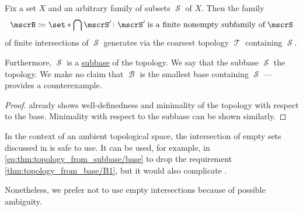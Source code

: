 \begin{proposition}\label{thm:topology_from_subbase}
  Fix a set \( X \) and an arbitrary family of subsets \( \mscrS \) of \( X \). Then the family
  \begin{equation}\label{eq:thm:topology_from_subbase/base}
    \mscrB \coloneqq \set*{ \bigcap \mscrS' \colon \mscrS' \T{is a finite nonempty subfamily of} \mscrS }
  \end{equation}
  of finite intersections of \( \mscrS \) generates via  the coarsest topology \( \mscrT \) containing \( \mscrS \).

  Furthermore, \( \mscrS \) is a \hyperref[def:topological_subbase]{subbase} of the topology. We say that the subbase \( \mscrS \)  the topology. We make no claim that \( \mscrB \) is the smallest base containing \( \mscrS \) ---  provides a counterexample.
\end{proposition}
\begin{proof}
   already shows well-definedness and minimality of the topology with respect to the base. Minimality with respect to the subbase can be shown similarly.
\end{proof}

\begin{remark}\label{rem:subbase_and_empty_intersection}
  In the context of an ambient topological space, the intersection of empty sets discussed in  is safe to use. It can be used, for example, in \eqref{eq:thm:topology_from_subbase/base} to drop the requirement \ref{thm:topology_from_base/B1}, but it would also complicate .

  Nonetheless, we prefer not to use empty intersections because of possible ambiguity.
\end{remark}

